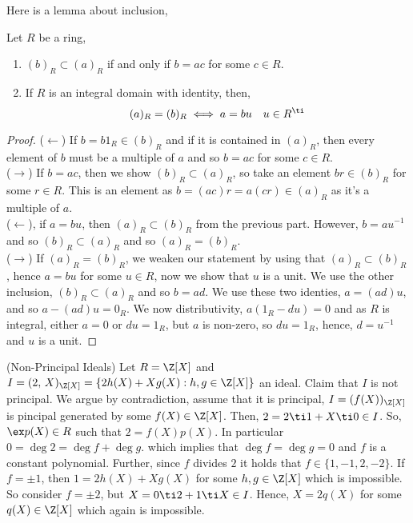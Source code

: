 Here is a lemma about inclusion,
\begin{nlemma}
  Let $R$ be a ring,
  \begin{enumerate}
    \item $(b)_R \subset (a)_R$ if and only if $b = ac$ for some $c \in R$.
    \item If $R$ is an integral domain with identity, then,
    $$ (a)_R = (b)_R \iff a = bu \quad u \in R^\ti $$
  \end{enumerate}
\end{nlemma}
\begin{proof}
  ($\longleftarrow$) If $b = b1_R \in (b)_R$ and if it is contained in $(a)_R$, then every element of $b$ must be a multiple of $a$ and so $b = ac$ for some $c \in R$.\\
  ($\longrightarrow$) If $b = ac$, then we show $(b)_R \subset (a)_R$, so take an element $br \in (b)_R$ for some $r \in R$. This is an element as $b = (ac)r = a(cr) \in (a)_R$ as it's a multiple of $a$. \\

  \noindent
  ($\longleftarrow$), if $a= bu$, then $(a)_R \subset (b)_R$ from the previous part. However, $b = au^{-1}$ and so $(b)_R \subset (a)_R$ and so $(a)_R = (b)_R$.\\
  ($\longrightarrow$) If $(a)_R = (b)_R$, we weaken our statement by using that $(a)_R \subset (b)_R$, hence $a = bu$ for some $u \in R$, now we show that $u$ is a unit. We use the other inclusion, $(b)_R \subset (a)_R$ and so $b = ad$. We use these two identies, $a = (ad)u$, and so $a - (ad)u = 0_R$. We now distributivity, $a(1_R - du) = 0$ and as $R$ is integral, either $a = 0$ or $du = 1_R$, but $a$ is non-zero, so $du = 1_R$, hence, $d = u^{-1}$ and $u$ is a unit.
\end{proof}

\begin{eg}{(Non-Principal Ideals)}
  Let $R = \Z[X]$ and $I = (2,\,X)_{\Z[X]} =\{2h(X) + Xg(X) : h, g \in \Z[X]\}$ an ideal. Claim that $I$ is not principal. We argue by contradiction, assume that it is principal, $I = (f(X))_{\Z[X]}$ is pincipal generated by some $f(X) \in \Z[X]$. Then, $2 = 2 \ti 1 + X \ti 0 \in I$. So, $\ex p(X) \in R$ such that $2 = f(X)p(X)$. In particular $0 = \deg 2 = \deg f + \deg g$.
  which implies that $\deg f = \deg g = 0$ and $f$ is a constant polynomial. Further, since $f$ divides $2$ it holds that $f \in \{1, -1, 2, -2\}$. If $f = \pm 1$, then $1 = 2h(X) + Xg(X)$ for some $h,g \in \Z[X]$ which is impossible. So consider $f = \pm 2$, but $X = 0 \ti 2 + 1 \ti X \in I$. Hence, $X = 2q(X)$ for some $q(X) \in \Z[X]$ which again is impossible.
\end{eg}

